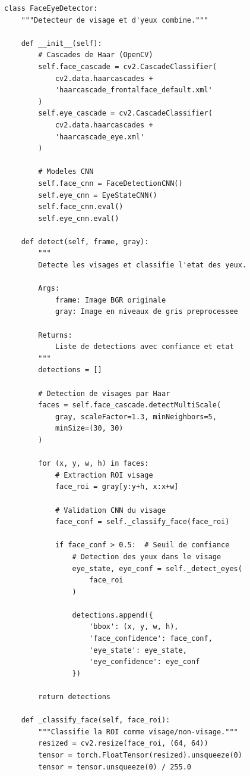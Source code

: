\documentclass[12pt,a4paper,twoside]{report}
\begin{document}
\begin{lstlisting}[style=pythonstyle, caption={Module de détection visage et yeux.}, label={lst:face_detection}]
class FaceEyeDetector:
    """Detecteur de visage et d'yeux combine."""
    
    def __init__(self):
        # Cascades de Haar (OpenCV)
        self.face_cascade = cv2.CascadeClassifier(
            cv2.data.haarcascades + 
            'haarcascade_frontalface_default.xml'
        )
        self.eye_cascade = cv2.CascadeClassifier(
            cv2.data.haarcascades + 
            'haarcascade_eye.xml'
        )
        
        # Modeles CNN
        self.face_cnn = FaceDetectionCNN()
        self.eye_cnn = EyeStateCNN()
        self.face_cnn.eval()
        self.eye_cnn.eval()
    
    def detect(self, frame, gray):
        """
        Detecte les visages et classifie l'etat des yeux.
        
        Args:
            frame: Image BGR originale
            gray: Image en niveaux de gris preprocessee
            
        Returns:
            Liste de detections avec confiance et etat
        """
        detections = []
        
        # Detection de visages par Haar
        faces = self.face_cascade.detectMultiScale(
            gray, scaleFactor=1.3, minNeighbors=5,
            minSize=(30, 30)
        )
        
        for (x, y, w, h) in faces:
            # Extraction ROI visage
            face_roi = gray[y:y+h, x:x+w]
            
            # Validation CNN du visage
            face_conf = self._classify_face(face_roi)
            
            if face_conf > 0.5:  # Seuil de confiance
                # Detection des yeux dans le visage
                eye_state, eye_conf = self._detect_eyes(
                    face_roi
                )
                
                detections.append({
                    'bbox': (x, y, w, h),
                    'face_confidence': face_conf,
                    'eye_state': eye_state,
                    'eye_confidence': eye_conf
                })
        
        return detections
    
    def _classify_face(self, face_roi):
        """Classifie la ROI comme visage/non-visage."""
        resized = cv2.resize(face_roi, (64, 64))
        tensor = torch.FloatTensor(resized).unsqueeze(0)
        tensor = tensor.unsqueeze(0) / 255.0
        

\end{lstlisting}
\end{document}
